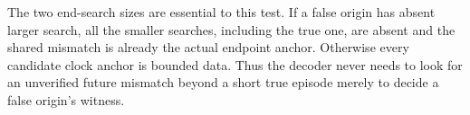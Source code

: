 The two end-search sizes are essential to this test.  If a false
origin has absent larger search, all the smaller searches,
including the true one, are absent and the shared mismatch is
already the actual endpoint anchor.  Otherwise every candidate
clock anchor is bounded data.  Thus the decoder never needs to
look for an unverified future mismatch beyond a short true
episode merely to decide a false origin's witness.
